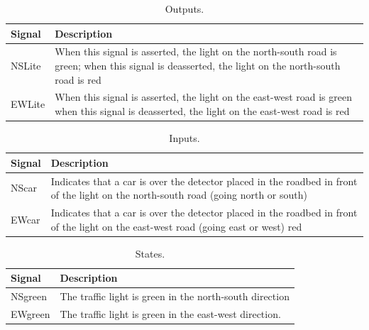 \documentclass[a4paper, 11pt,oneside]{article}
\begin{document}
\begin{table}[h!]
  \begin{center}
    \caption{Outputs.}
    \label{tab:Outputs}
    \begin{tabular}{l|p{4in}} 
      \textbf{Signal} & \textbf{Description}\\
      \hline
      NSLite & When this signal is asserted, the light on the north-south 
      road is green; when this signal is deasserted, the light on the 
      north-south road is red \\ \hline
      EWLite & When this signal is asserted, the light on the east-west road is 
      green when this signal is deasserted, the light on the east-west 
      road is 
      red \\ \hline
    \end{tabular}
  \end{center}
\end{table}

\begin{table}[h!]
  \begin{center}
    \caption{Inputs.}
    \label{tab:inputs}
    \begin{tabular}{l|p{4in}} 
      \textbf{Signal} & \textbf{Description}\\
      \hline
      NScar & Indicates that a car is over the detector placed in the roadbed 
      in front of the light on the north-south road (going north or south) \\ 
      \hline
      EWcar & Indicates that a car is over the detector placed in the roadbed 
      in front of the light on the east-west road (going east or west) red \\
      \hline
    \end{tabular}
  \end{center}
\end{table}

\begin{table}[h!]
  \begin{center}
    \caption{States.}
    \label{tab:states}
    \begin{tabular}{l|p{4in}} 
      \textbf{Signal} & \textbf{Description}\\
      \hline
      NSgreen & The traffic light is green in the north-south direction \\ 
      \hline
      EWgreen & The traffic light is green in the east-west direction. \\
      \hline
    \end{tabular}
  \end{center}
\end{table}
\end{document}

